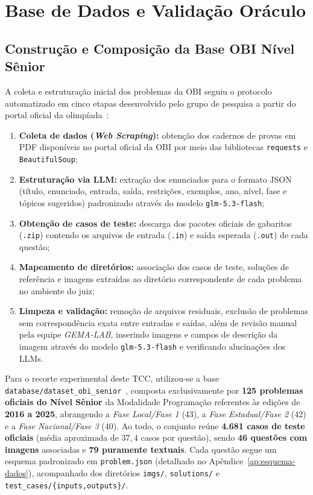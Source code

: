 \section{Base de Dados e Validação Oráculo}\label{sec:met-base}

\subsection{Construção e Composição da Base OBI Nível Sênior}\label{sec:met-base-composicao}

A coleta e estruturação inicial dos problemas da OBI seguiu o protocolo automatizado em cinco etapas desenvolvido pelo grupo de pesquisa a partir do portal oficial da olimpíada~\citep{obi_passadas,problems2026}:
\begin{enumerate}
    \item \textbf{Coleta de dados (\textit{Web Scraping}):} obtenção dos cadernos de provas em PDF disponíveis no portal oficial da OBI por meio das bibliotecas \texttt{requests} e \texttt{BeautifulSoup};
    \item \textbf{Estruturação via LLM:} extração dos enunciados para o formato JSON (título, enunciado, entrada, saída, restrições, exemplos, ano, nível, fase e tópicos sugeridos) padronizado através do modelo \texttt{glm-5.3-flash};
    \item \textbf{Obtenção de casos de teste:} descarga dos pacotes oficiais de gabaritos (\texttt{.zip}) contendo os arquivos de entrada (\texttt{.in}) e saída esperada (\texttt{.out}) de cada questão;
    \item \textbf{Mapeamento de diretórios:} associação dos casos de teste, soluções de referência e imagens extraídas ao diretório correspondente de cada problema no ambiente do juiz;
    \item \textbf{Limpeza e validação:} remoção de arquivos residuais, exclusão de problemas sem correspondência exata entre entradas e saídas, além de revisão manual pela equipe \textit{GEMA-LAB}, inserindo imagens e campos de descrição da imagem através do modelo \texttt{glm-5.3-flash} e verificando alucinações dos LLMs.
\end{enumerate}

Para o recorte experimental deste TCC, utilizou-se a base \texttt{database/dataset\_obi\_senior}~\citep{problems2026}, composta exclusivamente por \textbf{125 problemas oficiais do Nível Sênior} da Modalidade Programação referentes às edições de \textbf{2016 a 2025}, abrangendo a \textit{Fase Local/Fase 1} (43), a \textit{Fase Estadual/Fase 2} (42) e a \textit{Fase Nacional/Fase 3} (40). Ao todo, o conjunto reúne \textbf{4.681 casos de teste oficiais} (média aproximada de $37{,}4$ casos por questão), sendo \textbf{46 questões com imagens} associadas e \textbf{79 puramente textuais}. Cada questão segue um esquema padronizado em \texttt{problem.json} (detalhado no Apêndice~\ref{ap:esquema-dados}), acompanhado dos diretórios \texttt{imgs/}, \texttt{solutions/} e \texttt{test\_cases/\{inputs,outputs\}/}.

